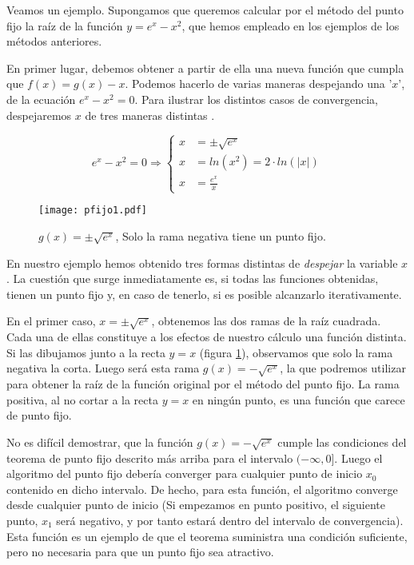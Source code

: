 Veamos un ejemplo. Supongamos  que queremos calcular por el método del punto fijo la raíz de la  
función $y=e^x-x^2$, que hemos empleado en los ejemplos de los métodos anteriores.

En primer lugar, debemos obtener a partir de ella una nueva función que cumpla que $f(x)=g(x)-x$. Podemos hacerlo de varias maneras despejando una '$x$', de la ecuación $e^x-x^2=0$.  Para ilustrar los distintos casos de convergencia, despejaremos $x$ de tres maneras distintas .

\begin{equation*}
e^x-x^2=0 \Rightarrow \left\{
\begin{aligned}
x&=\pm  \sqrt{e^x}\\
x&= ln(x^2)=2\cdot ln(\vert x \vert)\\
x&=\frac{e^x}{x} 
\end{aligned} 
\right.
\end{equation*}

\begin{figure}[h]
\texttt{[image: pfijo1.pdf]}
\caption{$g(x)=\pm \sqrt{e^x}$, Solo la rama negativa tiene un punto fijo.}
\label{fig:pfijo01}
\end{figure}

En nuestro ejemplo hemos obtenido tres formas distintas de \emph{despejar} la variable $x$. La cuestión que surge inmediatamente es, si todas las funciones obtenidas, tienen un punto fijo y, en caso de tenerlo, si es posible alcanzarlo iterativamente.

En el primer caso, $x=\pm \sqrt{e^x}$, obtenemos las dos ramas de la raíz cuadrada. Cada una de ellas constituye a los efectos de nuestro cálculo una función distinta. Si las dibujamos junto a la recta $y=x$ (figura \ref{fig:pfijo01}), observamos que solo la rama negativa la corta. Luego será  esta rama $g(x)=-\sqrt{e^x}$,  la que podremos utilizar para obtener la raíz de la función original por el método del punto fijo. La rama positiva, al no cortar a la recta $y=x$ en ningún punto, es una función que carece de punto fijo.

No es difícil demostrar, que la función $g(x)=-\sqrt{e^x} $ cumple las condiciones del teorema de punto fijo descrito más arriba para el intervalo $(-\infty, 0]$. Luego el algoritmo del punto fijo debería converger para cualquier punto de inicio $x_0$ contenido en dicho intervalo. De hecho, para esta función, el algoritmo converge desde cualquier punto de inicio (Si empezamos en punto positivo, el siguiente punto, $x_1$ será negativo, y por tanto estará dentro del intervalo de convergencia). Esta función es un ejemplo de que el teorema suministra una condición suficiente, pero no necesaria para que un punto fijo sea atractivo. 

